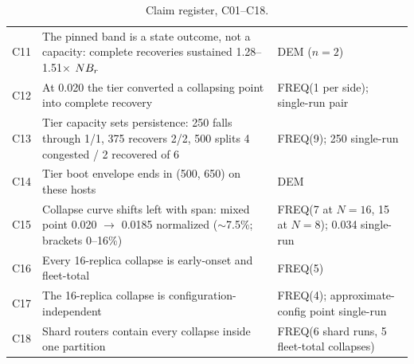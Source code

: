 \begin{table}[t]
\begin{tabularx}{\textwidth}{@{}lXl@{}}
C11 & The pinned band is a state outcome, not a capacity: complete recoveries sustained 1.28--1.51$\times$ $N B_r$ & DEM ($n=2$) \\
C12 & At 0.020 the tier converted a collapsing point into complete recovery & FREQ(1 per side); single-run pair \\
C13 & Tier capacity sets persistence: 250 falls through 1/1, 375 recovers 2/2, 500 splits 4 congested / 2 recovered of 6 & FREQ(9); 250 single-run \\
C14 & Tier boot envelope ends in (500, 650) on these hosts & DEM \\
C15 & Collapse curve shifts left with span: mixed point 0.020 $\to$ 0.0185 normalized ($\sim$7.5\%; brackets 0--16\%) & FREQ(7 at $N{=}16$, 15 at $N{=}8$); 0.034 single-run \\
C16 & Every 16-replica collapse is early-onset and fleet-total & FREQ(5) \\
C17 & The 16-replica collapse is configuration-independent & FREQ(4); approximate-config point single-run \\
C18 & Shard routers contain every collapse inside one partition & FREQ(6 shard runs, 5 fleet-total collapses) \\
\bottomrule
\end{tabularx}
\caption{Claim register, C01--C18.}
\label{tab:claims-a}
\end{table}

